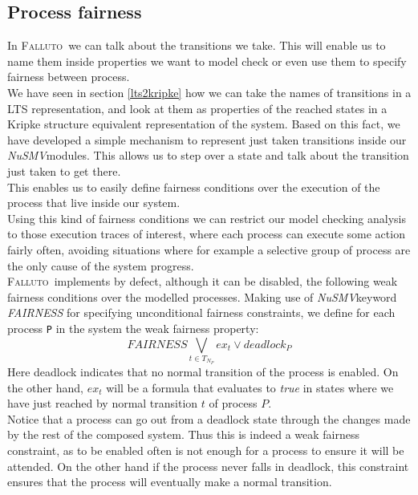\documentclass[12pt]{llncs2e/llncs}
\newcommand{\nusmv}{\mbox{\textit{NuSMV}}}
\newcommand{\fallutoSp}{\mbox{\textsc{Falluto~}}}
\begin{document}
\subsection{Process fairness}\label{process fairness}
In \fallutoSp we can talk about the transitions we take. This will enable us to name them inside properties we want to model check or even use them to specify fairness between process.\\
We have seen in section \ref{lts2kripke} how we can take the names of transitions in a LTS representation, and look at them as properties of the reached states in a Kripke structure equivalent representation of the system. Based on this fact, we have developed a simple mechanism to represent just taken transitions inside our \nusmv modules. This allows us to step over a state and talk about the transition just taken to get there.\\
This enables us to easily define fairness
conditions over the execution of the process that live inside our system.\\
Using this kind of fairness conditions we can restrict our model
checking analysis to those execution traces of interest, where each process
can execute some action fairly often, avoiding situations where for example a
selective group of process are the only cause of the system progress.\\        %
\fallutoSp implements by defect, although it can be disabled, the following weak fairness
conditions over the modelled processes. Making use of \nusmv keyword \textit{FAIRNESS} for specifying unconditional
fairness constraints, we define for each process \texttt{P} in the system the
weak fairness property:
$$FAIRNESS \bigvee_{t \in T_{N_{P}}} ex_t \vee deadlock_P$$
Here deadlock indicates that no normal transition of the process is enabled. On the other hand, $ex_t$ will be a formula that evaluates to \textit{true} in states where we have just reached by normal transition $t$ of process $P$.\\
Notice that a process can go out from a deadlock state through the
changes made by the rest of the composed system. Thus this is
indeed a weak fairness constraint, as to be enabled often is not enough for a
process to ensure it will be attended. On the other hand if the process never
falls in deadlock, this constraint ensures that the process will eventually
make a normal transition.
\end{document}
